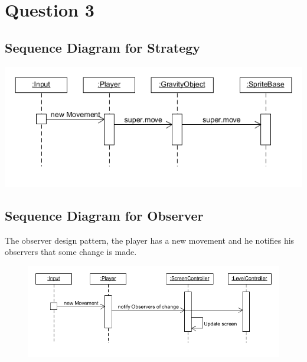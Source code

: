 \section{Question 3}

\subsection{Sequence Diagram for Strategy}
\includegraphics[width=\textwidth]{sequenceDiagramStrategy}

\subsection{Sequence Diagram for Observer}
The observer design pattern, the player has a new movement and he notifies his observers that some change is made.
\begin{figure}[h]
\includegraphics[width=\textwidth]{sequenceDiagramObserver}
\end{figure}
